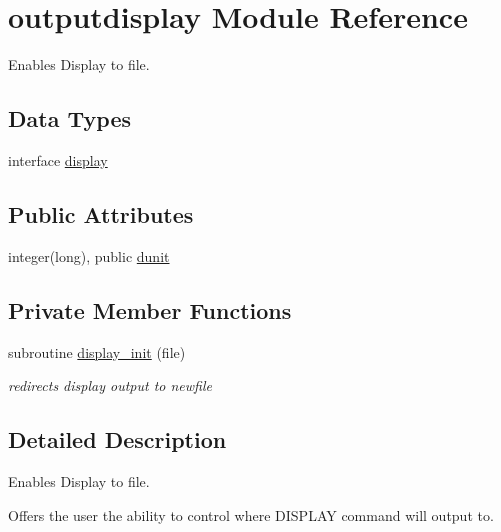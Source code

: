 \hypertarget{classoutputdisplay}{\section{outputdisplay Module Reference}
\label{classoutputdisplay}
}


Enables Display to file.  


\subsection*{Data Types}
\begin{DoxyCompactItemize}
\item 
interface \hyperlink{interfaceoutputdisplay_1_1display}{display}
\end{DoxyCompactItemize}
\subsection*{Public Attributes}
\begin{DoxyCompactItemize}
\item 
integer(long), public \hyperlink{classoutputdisplay_a37a1610ae7e198bc24d119cea584a6f2}{dunit}
\end{DoxyCompactItemize}
\subsection*{Private Member Functions}
\begin{DoxyCompactItemize}
\item 
subroutine \hyperlink{classoutputdisplay_a9a8a15080a89f2947af09f8fb326a2e0}{display\-\_\-init} (file)
\begin{DoxyCompactList}\small\item\em redirects display output to newfile \end{DoxyCompactList}\end{DoxyCompactItemize}


\subsection{Detailed Description}
Enables Display to file. 

Offers the user the ability to control where D\-I\-S\-P\-L\-A\-Y command will output to. 

